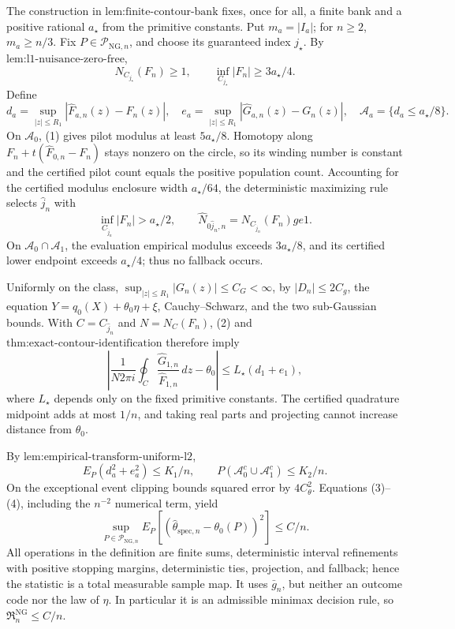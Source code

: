 The construction in \(\text{lem:finite-contour-bank}\) fixes, once for all, a finite bank and a positive rational \(a_{\star}\) from the primitive constants.  Put \(m_a=|I_a|\); for \(n\ge2\), \(m_a\ge n/3\).  Fix \(P\in\mathcal P_{\mathrm{NG},n}\), and choose its guaranteed index \(j_{\star}\).  By \(\text{lem:l1-nuisance-zero-free}\),
\[
 N_{C_{j_{\star}}}(F_n)\ge1,
 \qquad \inf_{C_{j_{\star}}}|F_n|\ge3a_{\star}/4. \tag{1}
\]
Define
\[
 d_a=\sup_{|z|\le R_1}|\widehat F_{a,n}(z)-F_n(z)|,
 \quad e_a=\sup_{|z|\le R_1}|\widehat G_{a,n}(z)-G_n(z)|,
 \quad \mathcal A_a=\{d_a\le a_{\star}/8\}.
\]
On \(\mathcal A_0\), (1) gives pilot modulus at least \(5a_{\star}/8\).  Homotopy along \(F_n+t(\widehat F_{0,n}-F_n)\) stays nonzero on the circle, so its winding number is constant and the certified pilot count equals the positive population count.  Accounting for the certified modulus enclosure width \(a_{\star}/64\), the deterministic maximizing rule selects \(\widehat j_n\) with
\[
 \inf_{C_{\widehat j_n}}|F_n|>a_{\star}/2,
 \qquad \widehat N_{0\widehat j_n,n}=N_{C_{\widehat j_n}}(F_n)ge1. \tag{2}
\]
On \(\mathcal A_0\cap\mathcal A_1\), the evaluation empirical modulus exceeds \(3a_{\star}/8\), and its certified lower endpoint exceeds \(a_{\star}/4\); thus no fallback occurs.

Uniformly on the class, \(\sup_{|z|\le R_1}|G_n(z)|\le C_G<\infty\), by \(|D_n|\le2C_g\), the equation \(Y=q_0(X)+\theta_0\eta+\xi\), Cauchy--Schwarz, and the two sub-Gaussian bounds.  With \(C=C_{\widehat j_n}\) and \(N=N_C(F_n)\), (2) and \(\text{thm:exact-contour-identification}\) therefore imply
\[
 \left|\frac{1}{N2\pi i}\oint_C
 \frac{\widehat G_{1,n}}{\widehat F_{1,n}}\,dz-\theta_0\right|
 \le L_{\star}(d_1+e_1), \tag{3}
\]
where \(L_{\star}\) depends only on the fixed primitive constants.  The certified quadrature midpoint adds at most \(1/n\), and taking real parts and projecting cannot increase distance from \(\theta_0\).

By \(\text{lem:empirical-transform-uniform-l2}\),
\[
 E_P(d_a^2+e_a^2)\le K_1/n,
 \qquad P(\mathcal A_0^c\cup\mathcal A_1^c)\le K_2/n. \tag{4}
\]
On the exceptional event clipping bounds squared error by \(4C_{\theta}^2\).  Equations (3)--(4), including the \(n^{-2}\) numerical term, yield
\[
 \sup_{P\in\mathcal P_{\mathrm{NG},n}}
 E_P[(\widehat\theta_{\mathrm{spec},n}-\theta_0(P))^2]\le C/n. \tag{5}
\]
All operations in the definition are finite sums, deterministic interval refinements with positive stopping margins, deterministic ties, projection, and fallback; hence the statistic is a total measurable sample map.  It uses \(\bar g_n\), but neither an outcome code nor the law of \(\eta\).  In particular it is an admissible minimax decision rule, so \(\mathfrak R_n^{\mathrm{NG}}\le C/n\).

